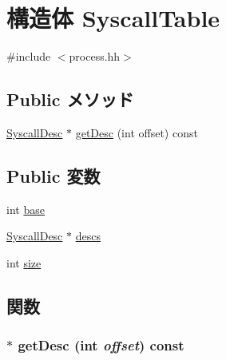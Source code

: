 \hypertarget{structArmLinuxProcessBits_1_1SyscallTable}{
\section{構造体 SyscallTable}
\label{structArmLinuxProcessBits_1_1SyscallTable}
}


{\ttfamily \#include $<$process.hh$>$}\subsection*{Public メソッド}
\begin{DoxyCompactItemize}
\item 
\hyperlink{classSyscallDesc}{SyscallDesc} $\ast$ \hyperlink{structArmLinuxProcessBits_1_1SyscallTable_a507e5bbd78e75a8b0c7d057fe5f1b7b3}{getDesc} (int offset) const 
\end{DoxyCompactItemize}
\subsection*{Public 変数}
\begin{DoxyCompactItemize}
\item 
int \hyperlink{structArmLinuxProcessBits_1_1SyscallTable_a19437a5875428e719515fb20de8a6927}{base}
\item 
\hyperlink{classSyscallDesc}{SyscallDesc} $\ast$ \hyperlink{structArmLinuxProcessBits_1_1SyscallTable_a1bb5ae25f325719fb834ca7b8046333a}{descs}
\item 
int \hyperlink{structArmLinuxProcessBits_1_1SyscallTable_a439227feff9d7f55384e8780cfc2eb82}{size}
\end{DoxyCompactItemize}


\subsection{関数}
\hypertarget{structArmLinuxProcessBits_1_1SyscallTable_a507e5bbd78e75a8b0c7d057fe5f1b7b3}{
\subsubsection[{getDesc}]{ $\ast$ getDesc (int {\em offset}) const}}
\label{structArmLinuxProcessBits_1_1SyscallTable_a507e5bbd78e75a8b0c7d057fe5f1b7b3}




